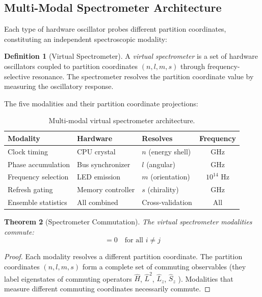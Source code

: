 \documentclass[11pt,a4paper]{article}
\newtheorem{theorem}{Theorem}[section]
\theoremstyle{definition}
\newtheorem{definition}[theorem]{Definition}
\theoremstyle{remark}
\begin{document}
\subsection{Multi-Modal Spectrometer Architecture}

Each type of hardware oscillator probes different partition coordinates, constituting an independent spectroscopic modality:

\begin{definition}[Virtual Spectrometer]
A \emph{virtual spectrometer} is a set of hardware oscillators coupled to partition coordinates $(n, l, m, s)$ through frequency-selective resonance. The spectrometer resolves the partition coordinate value by measuring the oscillatory response.
\end{definition}

The five modalities and their partition coordinate projections:

\begin{table}[H]
\centering
\caption{Multi-modal virtual spectrometer architecture.}
\label{tab:spectrometer}
\small
\begin{tabular}{lllc}
\toprule
\textbf{Modality} & \textbf{Hardware} & \textbf{Resolves} & \textbf{Frequency} \\
\midrule
Clock timing & CPU crystal & $n$ (energy shell) & GHz \\
Phase accumulation & Bus synchronizer & $l$ (angular) & GHz \\
Frequency selection & LED emission & $m$ (orientation) & $10^{14}$ Hz \\
Refresh gating & Memory controller & $s$ (chirality) & GHz \\
Ensemble statistics & All combined & Cross-validation & All \\
\bottomrule
\end{tabular}
\end{table}

\begin{theorem}[Spectrometer Commutation]
\label{thm:spectrometer_commute}
The virtual spectrometer modalities commute:
\begin{equation}
[\hat{O}_{\mathrm{mod}}^{(i)}, \hat{O}_{\mathrm{mod}}^{(j)}] = 0 \quad \text{for all } i \neq j
\end{equation}
\end{theorem}

\begin{proof}
Each modality resolves a different partition coordinate. The partition coordinates $(n, l, m, s)$ form a complete set of commuting observables (they label eigenstates of commuting operators $\hat{H}$, $\hat{L}^2$, $\hat{L}_z$, $\hat{S}_z$ \citep{griffiths2018}). Modalities that measure different commuting coordinates necessarily commute.
\end{proof}
\end{document}

